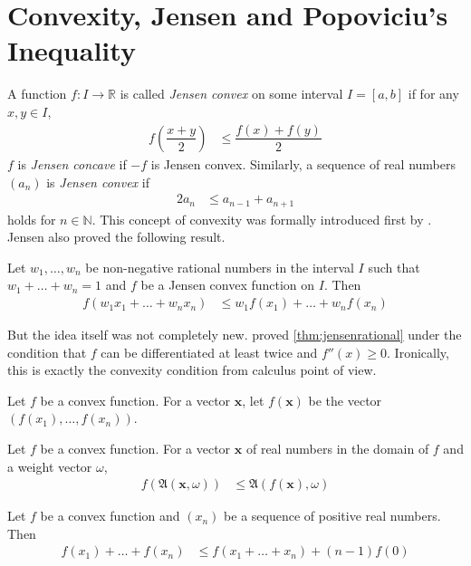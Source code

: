 \documentclass{subfile}
\begin{document}
	\section[Jensen and Popoviciu]{Convexity, Jensen and Popoviciu's Inequality}\label{sec:convexity}
	A function $f:I\to\mathbb{R}$ is called \textit{Jensen convex} on some interval $I=[a,b]$ if for any $x,y\in I$,
		\begin{align*}
			f\left(\dfrac{x+y}{2}\right)
				& \leq \dfrac{f(x)+f(y)}{2}
		\end{align*}
	$f$ is \textit{Jensen concave} if $-f$ is Jensen convex. Similarly, a sequence of real numbers $(a_{n})$ is \textit{Jensen convex} if
		\begin{align*}
			2a_{n}
				& \leq a_{n-1}+a_{n+1}
		\end{align*}
	holds for $n\in\mathbb{N}$. This concept of convexity was formally introduced first by \textcite{jensen_1905, jensen_1906}. Jensen also proved the following result.
		\begin{theorem}\label{thm:jensenrational}
			Let $w_{1},\ldots,w_{n}$ be non-negative rational numbers in the interval $I$ such that $w_{1}+\ldots+w_{n}=1$ and $f$ be a Jensen convex function on $I$. Then
				\begin{align*}
					f(w_{1}x_{1}+\ldots+w_{n}x_{n})
						& \leq w_{1}f(x_{1})+\ldots+w_{n}f(x_{n})
				\end{align*}
		\end{theorem}
	But the idea itself was not completely new. \textcite{holder_1889} proved \autoref{thm:jensenrational} under the condition that $f$ can be differentiated at least twice and $f''(x)\geq 0$. Ironically, this is exactly the convexity condition from calculus point of view.
	
	Let $f$ be a convex function. For a vector $\mathbf{x}$, let $f(\mathbf{x})$ be the vector $(f(x_{1}),\ldots,f(x_{n}))$.
		\begin{theorem}\label{thm:weightedjensen}
			Let $f$ be a convex function. For a vector $\mathbf{x}$ of real numbers in the domain of $f$ and a weight vector $\omega$,
				\begin{align*}
					f\left(\mathfrak{A}(\mathbf{x},\omega)\right)
						& \leq \mathfrak{A}(f(\mathbf{x}),\omega)
				\end{align*}
		\end{theorem}
	
		\begin{theorem}
			Let $f$ be a convex function and $(x_{n})$ be a sequence of positive real numbers. Then
				\begin{align*}
					f(x_{1})+\ldots+f(x_{n})
						& \leq f(x_{1}+\ldots+x_{n})+(n-1)f(0)
				\end{align*}
		\end{theorem}
	
\end{document}
